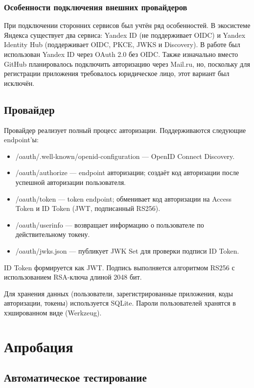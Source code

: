 \documentclass[a4paper]{article}
\begin{document}
\subsubsection{Особенности подключения внешних провайдеров}

При подключении сторонних сервисов был учтён ряд особенностей. В экосистеме Яндекса существует два сервиса: Yandex ID (не поддерживает OIDC) и Yandex Identity Hub (поддерживает OIDC, PKCE, JWKS и Discovery). В работе был использован Yandex ID через OAuth 2.0 без OIDC. Также изначально вместо GitHub планировалось подключить авторизацию через Mail.ru, но, поскольку для регистрации приложения требовалось юридическое лицо, этот вариант был исключён.

\subsection{Провайдер}

Провайдер реализует полный процесс авторизации. Поддерживаются следующие endpoint'ы:
\begin{itemize}
    \item /oauth/.well-known/openid-configuration --- OpenID Connect Discovery.
    \item /oauth/authorize --- endpoint авторизации; создаёт код авторизации после успешной авторизации пользователя.
    \item /oauth/token --- token endpoint; обменивает код авторизации на Access Token и ID Token (JWT, подписанный RS256).
    \item /oauth/userinfo --- возвращает информацию о пользователе по действительному токену.
    \item /oauth/jwks.json --- публикует JWK Set для проверки подписи ID Token.
\end{itemize}

ID Token формируется как JWT. Подпись выполняется алгоритмом RS256 с использованием RSA-ключа длиной 2048 бит.

Для хранения данных (пользователи, зарегистрированные приложения, коды авторизации, токены) используется SQLite. Пароли пользователей хранятся в хэшированном виде (Werkzeug).

\section{Апробация}

\subsection{Автоматическое тестирование}
\end{document}
